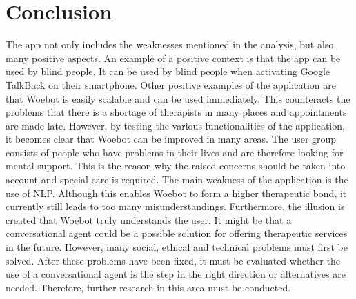 \section{Conclusion}\label{sec:conclusion}
The app not only includes the weaknesses mentioned in the analysis, but also many positive aspects.
An example of a positive context is that the app can be used by blind people.
It can be used by blind people when activating Google TalkBack on their smartphone.
Other positive examples of the application are that Woebot is easily scalable and can be used immediately.
This counteracts the problems that there is a shortage of therapists in many places and appointments are made late.
However, by testing the various functionalities of the application, it becomes clear that Woebot can be improved in many areas.
The user group consists of people who have problems in their lives and are therefore looking for mental support.
This is the reason why the raised concerns should be taken into account and special care is required.
The main weakness of the application is the use of NLP. 
Although this enables Woebot to form a higher therapeutic bond, it currently still leads to too many misunderstandings.
Furthermore, the illusion is created that Woebot truly understands the user.
It might be that a conversational agent could be a possible solution for offering therapeutic services in the future.
However, many social, ethical and technical problems must first be solved.
After these problems have been fixed, it must be evaluated whether the use of a conversational agent is the step in the right direction or alternatives are needed.
Therefore, further research in this area must be conducted.
